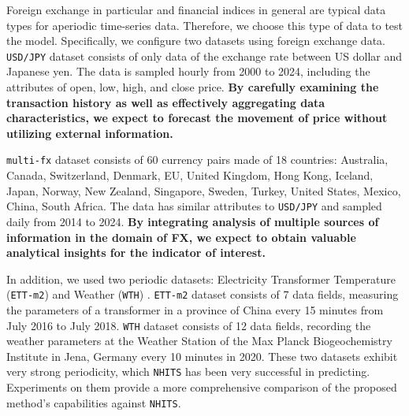 Foreign exchange in particular and financial indices in general are typical data types for aperiodic time-series data. Therefore, we choose this type of data to test the model. Specifically, we configure two datasets using foreign exchange data. \verb|USD/JPY| dataset consists of only data of the exchange rate between US dollar and Japanese yen. The data is sampled hourly from 2000 to 2024, including the attributes of open, low, high, and close price. \textbf{By carefully examining the transaction history as well as effectively aggregating data characteristics, we expect to forecast the movement of price without utilizing external information.}

\verb|multi-fx| dataset consists of 60 currency pairs made of 18 countries: Australia, Canada, Switzerland, Denmark, EU, United Kingdom, Hong Kong, Iceland, Japan, Norway, New Zealand, Singapore, Sweden, Turkey, United States, Mexico, China, South Africa. The data has similar attributes to \verb|USD/JPY| and sampled daily from 2014 to 2024. \textbf{By integrating analysis of multiple sources of information in the domain of FX, we expect to obtain valuable analytical insights for the indicator of interest.}


In addition, we used two periodic datasets: Electricity Transformer Temperature (\verb|ETT-m2|) \cite{zhou2021informer} and Weather (\verb|WTH|) \cite{Kolle}. \verb|ETT-m2| dataset consists of 7 data fields, measuring the parameters of a transformer in a province of China every 15 minutes from July 2016 to July 2018. \verb|WTH| dataset consists of 12 data fields, recording the weather parameters at the Weather Station of the Max Planck Biogeochemistry Institute in Jena, Germany every 10 minutes in 2020. These two datasets exhibit very strong periodicity, which \verb|NHITS| has been very successful in predicting. Experiments on them provide a more comprehensive comparison of the proposed method's capabilities against \verb|NHITS|.

